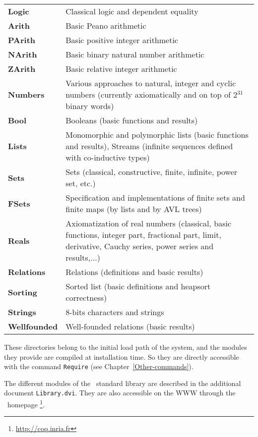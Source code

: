 \begin{tabular}{lp{12cm}}
  {\bf Logic}   & Classical logic and dependent equality \\
  {\bf Arith}   & Basic Peano arithmetic \\
  {\bf PArith}  & Basic positive integer arithmetic \\
  {\bf NArith}  & Basic binary natural number arithmetic \\
  {\bf ZArith}  & Basic relative integer arithmetic \\
  {\bf Numbers} & Various approaches to natural, integer and cyclic numbers (currently axiomatically and on top of 2$^{31}$ binary words) \\
  {\bf Bool}    & Booleans (basic functions and results) \\
  {\bf Lists}   & Monomorphic and polymorphic lists (basic functions and
            results), Streams (infinite sequences defined with co-inductive
            types) \\
  {\bf Sets}    & Sets (classical, constructive, finite, infinite, power set,
            etc.) \\
  {\bf FSets}   & Specification and implementations of finite sets and finite
                  maps (by lists and by AVL trees)\\
 {\bf Reals}    & Axiomatization of real numbers (classical, basic functions,
                  integer part, fractional part, limit, derivative, Cauchy
                  series, power series and results,...)\\
 {\bf Relations} & Relations (definitions and basic results) \\
 {\bf Sorting}  & Sorted list (basic definitions and heapsort correctness) \\
 {\bf Strings}  & 8-bits characters and strings\\
 {\bf Wellfounded} & Well-founded relations (basic results) \\

\end{tabular}
\medskip

These directories belong to the initial load path of the system, and
the modules they provide are compiled at installation time. So they
are directly accessible with the command \verb!Require! (see
Chapter~\ref{Other-commands}).

The different modules of the \Coq\ standard library are described in the
additional document \verb!Library.dvi!. They are also accessible on the WWW
through the \Coq\ homepage
\footnote{\url{http://coq.inria.fr}}.

